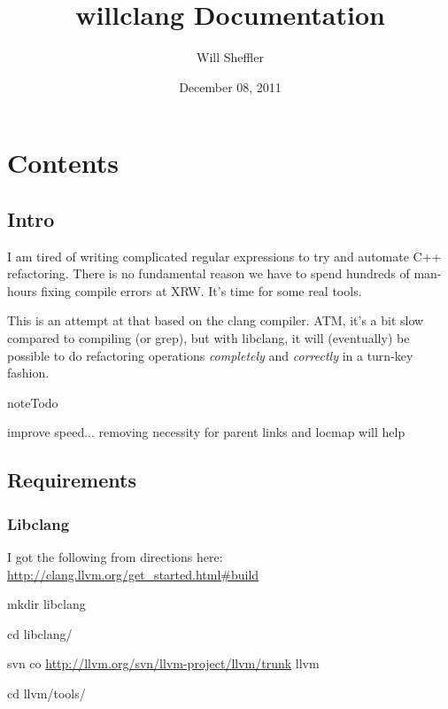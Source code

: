 \documentclass[letterpaper,10pt,english]{sphinxmanual}
\title{willclang Documentation}
\date{December 08, 2011}
\author{Will Sheffler}
\begin{document}
\maketitle
\tableofcontents
{}\label{index::doc}



\chapter{Contents}
\label{index:contents}\label{index:welcome-to-willclang-s-documentation}

\section{Intro}
\label{intro:intro}\label{intro::doc}
I am tired of writing complicated regular expressions to try and automate C++ refactoring. There is no fundamental reason we have to spend hundreds of man-hours fixing compile errors at XRW. It's time for some real tools.

This is an attempt at that based on the clang compiler. ATM, it's a bit slow compared to compiling (or grep), but with libclang, it will (eventually) be possible to do refactoring operations \emph{completely} and \emph{correctly} in a turn-key fashion.

\begin{notice}{note}{Todo}

improve speed... removing necessity for parent links and locmap will help
\end{notice}


\section{Requirements}
\label{intro:requirements}

\subsection{Libclang}
\label{intro:libclang}
I got the following from directions here: \href{http://clang.llvm.org/get\_started.html\#build}{http://clang.llvm.org/get\_started.html\#build}

mkdir libclang

cd libclang/

svn co \href{http://llvm.org/svn/llvm-project/llvm/trunk}{http://llvm.org/svn/llvm-project/llvm/trunk} llvm

cd llvm/tools/
\end{document}
